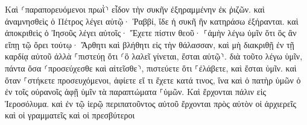 \documentclass{openreader}
\begin{document}
Καὶ ⸂παραπορευόμενοι πρωῒ⸃ εἶδον τὴν συκῆν ἐξηραμμένην ἐκ ῥιζῶν. 
καὶ ἀναμνησθεὶς ὁ Πέτρος λέγει αὐτῷ· Ῥαββί, ἴδε ἡ συκῆ ἣν κατηράσω ἐξήρανται. 
καὶ ἀποκριθεὶς ὁ Ἰησοῦς λέγει αὐτοῖς· Ἔχετε πίστιν θεοῦ· 
⸀ἀμὴν λέγω ὑμῖν ὅτι ὃς ἂν εἴπῃ τῷ ὄρει τούτῳ· Ἄρθητι καὶ βλήθητι εἰς τὴν θάλασσαν, καὶ μὴ διακριθῇ ἐν τῇ καρδίᾳ αὐτοῦ ἀλλὰ ⸀πιστεύῃ ὅτι ⸂ὃ λαλεῖ γίνεται, ἔσται αὐτῷ⸃. 
διὰ τοῦτο λέγω ὑμῖν, πάντα ὅσα ⸂προσεύχεσθε καὶ αἰτεῖσθε⸃, πιστεύετε ὅτι ⸀ἐλάβετε, καὶ ἔσται ὑμῖν. 
καὶ ὅταν ⸀στήκετε προσευχόμενοι, ἀφίετε εἴ τι ἔχετε κατά τινος, ἵνα καὶ ὁ πατὴρ ὑμῶν ὁ ἐν τοῖς οὐρανοῖς ἀφῇ ὑμῖν τὰ παραπτώματα ⸀ὑμῶν. 
Καὶ ἔρχονται πάλιν εἰς Ἱεροσόλυμα. καὶ ἐν τῷ ἱερῷ περιπατοῦντος αὐτοῦ ἔρχονται πρὸς αὐτὸν οἱ ἀρχιερεῖς καὶ οἱ γραμματεῖς καὶ οἱ πρεσβύτεροι 
\end{document}
